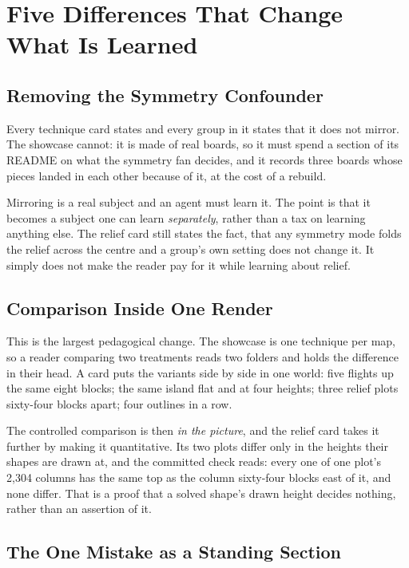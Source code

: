 \section{Five Differences That Change What Is Learned}

\subsection{Removing the Symmetry Confounder}

Every technique card states  and every group in it states
that it does not mirror. The showcase cannot: it is made of real boards, so it must
spend a section of its README on what the symmetry fan decides, and it records
three boards whose pieces landed in each other because of it, at the cost of a
rebuild.

Mirroring is a real subject and an agent must learn it. The point is that it
becomes a subject one can learn \emph{separately}, rather than a tax on learning
anything else. The relief card still states the fact, that any symmetry mode folds
the relief across the centre and a group's own setting does not change it. It
simply does not make the reader pay for it while learning about relief.

\subsection{Comparison Inside One Render}

This is the largest pedagogical change. The showcase is one technique per map, so a
reader comparing two treatments reads two folders and holds the difference in their
head. A card puts the variants side by side in one world: five flights up the same
eight blocks; the same island flat and at four heights; three relief plots
sixty-four blocks apart; four outlines in a row.

The controlled comparison is then \emph{in the picture}, and the relief card takes
it further by making it quantitative. Its two plots differ only in the heights their
shapes are drawn at, and the committed check reads: every one of one plot's 2{,}304
columns has the same top as the column sixty-four blocks east of it, and none
differ. That is a proof that a solved shape's drawn height decides nothing, rather
than an assertion of it.

\subsection{The One Mistake as a Standing Section}

